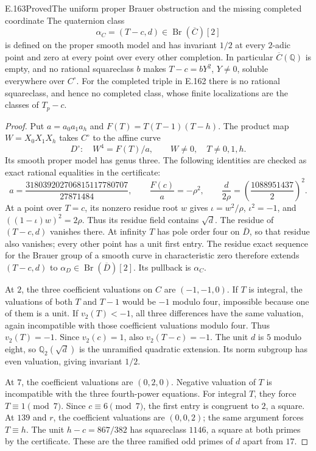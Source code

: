 \begin{result}{E.163}{Proved}{The uniform proper Brauer obstruction and the missing completed coordinate}
The quaternion class
\[
 \alpha_C=(T-c,d)\in\operatorname{Br}(\overline C)[2]
\]
is defined on the proper smooth model and has invariant $1/2$
at every $2$-adic point and zero at every point over every
other completion.  In particular $\overline C(\mathbb Q)$
is empty, and no rational squareclass $b$ makes
$T-c=bY^2$, $Y\ne0$, soluble everywhere over $C^\circ$.
For the completed triple in E.162 there is no rational
squareclass, and hence no completed class, whose finite
localizations are the classes of $T_p-c$.
\end{result}
\begin{proof}
Put $a=a_0a_1a_h$ and $F(T)=T(T-1)(T-h)$.  The product map
$W=X_0X_1X_h$ takes $C^\circ$ to the affine curve
\[
 D^\circ:\quad W^4=F(T)/a,\qquad W\ne0,
 \quad T\ne0,1,h.
\tag{E.163.1}
\]
Its smooth proper model has genus three.  The following
identities are checked as exact rational equalities in the
certificate:
\[
 a=\frac{318039202706815117780707}{27871484},\qquad
 \frac{F(c)}a=-\rho^2,\qquad
 \frac{d}{2\rho}=\left(\frac{1088951437}{2}\right)^2.
\tag{E.163.2}
\]
At a point over $T=c$, its nonzero residue root $w$ gives
$\iota=w^2/\rho$, $\iota^2=-1$, and
$((1-\iota)w)^2=2\rho$.  Thus its residue field contains
$\sqrt d$.  The residue of $(T-c,d)$ vanishes there.
At infinity $T$ has pole order four on $\overline D$, so
that residue also vanishes; every other point has a unit
first entry.  The residue exact sequence for the Brauer
group of a smooth curve in characteristic zero
\citep[\S4.4, p.~20]{LitColliotThelene2015AWS}
therefore extends $(T-c,d)$ to $\alpha_D\in
\operatorname{Br}(\overline D)[2]$.  Its pullback is $\alpha_C$.

At $2$, the three coefficient valuations on $C$ are
$(-1,-1,0)$.  If $T$ is integral, the valuations of both
$T$ and $T-1$ would be $-1$ modulo four, impossible because
one of them is a unit.  If $v_2(T)<-1$, all three differences
have the same valuation, again incompatible with those
coefficient valuations modulo four.  Thus $v_2(T)=-1$.
Since $v_2(c)=1$, also $v_2(T-c)=-1$.  The unit $d$ is
$5$ modulo eight, so $\mathbb Q_2(\sqrt d)$ is the unramified
quadratic extension.  Its norm subgroup has even valuation,
giving invariant $1/2$.

At $7$, the coefficient valuations are $(0,2,0)$.
Negative valuation of $T$ is incompatible with the three
fourth-power equations.  For integral $T$, they force
$T\equiv1\pmod7$.  Since $c\equiv6\pmod7$, the first entry
is congruent to $2$, a square.  At $139$ and $r$, the
coefficient valuations are $(0,0,2)$; the same argument
forces $T\equiv h$.  The unit $h-c=867/382$ has squareclass
$1146$, a square at both primes by the certificate.
These are the three ramified odd primes of $d$ apart from $17$.


\end{proof}
